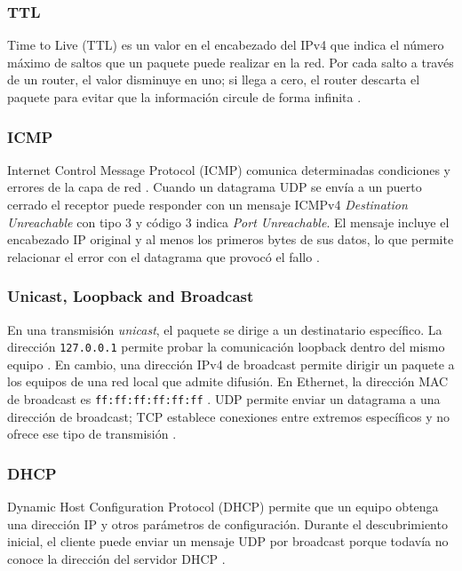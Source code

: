 \subsubsection{TTL}
Time to Live (TTL) es un valor en el encabezado del IPv4 que indica el número máximo de saltos que un paquete puede realizar en la red. Por cada salto a través de un router, el valor disminuye en uno; si llega a cero, el router descarta el paquete para evitar que la información circule de forma infinita \cite{kurose2021}.

\subsubsection{ICMP}
Internet Control Message Protocol (ICMP) comunica determinadas condiciones y errores de la capa de red \cite{kurose2021,rfc792}. Cuando un datagrama UDP se envía a un puerto cerrado el receptor puede responder con un mensaje ICMPv4 \textit{Destination Unreachable} con tipo 3 y código 3 indica \textit{Port Unreachable}. El mensaje incluye el encabezado IP original y al menos los primeros bytes de sus datos, lo que permite relacionar el error con el datagrama que provocó el fallo \cite{rfc792}.

\subsubsection{Unicast, Loopback and Broadcast}
En una transmisión \textit{unicast}, el paquete se dirige a un destinatario específico. La dirección \texttt{127.0.0.1} permite probar la comunicación loopback dentro del mismo equipo \cite{kurose2021}. En cambio, una dirección IPv4 de broadcast permite dirigir un paquete a los equipos de una red local que admite difusión. En Ethernet, la dirección MAC de broadcast es \texttt{ff:ff:ff:ff:ff:ff} \cite{rfc919,kurose2021}. UDP permite enviar un datagrama a una dirección de broadcast; TCP establece conexiones entre extremos específicos y no ofrece ese tipo de transmisión \cite{rfc768,rfc9293}.

\subsubsection{DHCP}
Dynamic Host Configuration Protocol (DHCP) permite que un equipo obtenga una dirección IP y otros parámetros de configuración. Durante el descubrimiento inicial, el cliente puede enviar un mensaje UDP por broadcast porque todavía no conoce la dirección del servidor DHCP \cite{rfc2131}.

